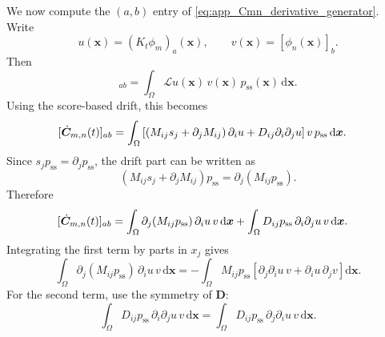 \documentclass[11pt,twoside,fleqn]{article}
\renewcommand{\d}{\mathrm{d}}
\begin{document}
We now compute the $(a,b)$ entry of \eqref{eq:app_Cmn_derivative_generator}. Write
\[
    u(\bm{x})=(K_t\phi_m)_a(\bm{x}),
    \qquad
    v(\bm{x})=[\phi_n(\bm{x})]_b .
\]
Then
\begin{equation}
    [\dot{\bm{C}}_{m,n}(t)]_{ab}
    =
    \int_\Omega
        \mathcal{L}u(\bm{x})\,
        v(\bm{x})\,
        p_{\mathrm{ss}}(\bm{x})\,
        \d\bm{x}.
    \label{eq:app_C_entry_uv}
\end{equation}
Using the score-based drift, this becomes
\begin{equation}
\begin{aligned}
    \relax[\dot{\bm{C}}_{m,n}(t)]_{ab}
    &=
    \int_\Omega
    \left[
        \left(
            M_{ij}s_j+\partial_jM_{ij}
        \right)\partial_i u
        +
        D_{ij}\partial_i\partial_j u
    \right]
    v\,p_{\mathrm{ss}}\,\d\bm{x}.
\end{aligned}
\label{eq:app_generator_expanded_uv}
\end{equation}
Since $s_jp_{\mathrm{ss}}=\partial_jp_{\mathrm{ss}}$, the drift part can be written as
\begin{equation}
    \left(
        M_{ij}s_j+\partial_jM_{ij}
    \right)p_{\mathrm{ss}}
    =
    \partial_j(M_{ij}p_{\mathrm{ss}}).
    \label{eq:app_drift_divergence_identity}
\end{equation}
Therefore
\begin{equation}
\begin{aligned}
    \relax[\dot{\bm{C}}_{m,n}(t)]_{ab}
    &=
    \int_\Omega
        \partial_j(M_{ij}p_{\mathrm{ss}})
        \,\partial_i u\,v\,\d\bm{x}
    +
    \int_\Omega
        D_{ij}p_{\mathrm{ss}}
        \,\partial_i\partial_j u\,v\,\d\bm{x}.
\end{aligned}
\label{eq:app_two_terms_before_parts}
\end{equation}
Integrating the first term by parts in $x_j$ gives
\begin{equation}
    \int_\Omega
        \partial_j(M_{ij}p_{\mathrm{ss}})
        \,\partial_i u\,v\,\d\bm{x}
    =
    -
    \int_\Omega
        M_{ij}p_{\mathrm{ss}}
        \left[
            \partial_j\partial_i u\,v
            +
            \partial_i u\,\partial_j v
        \right]\d\bm{x}.
    \label{eq:app_first_term_parts}
\end{equation}
For the second term, use the symmetry of $\bm{D}$:
\begin{equation}
    \int_\Omega
        D_{ij}p_{\mathrm{ss}}
        \,\partial_i\partial_j u\,v\,\d\bm{x}
    =
    \int_\Omega
        D_{ij}p_{\mathrm{ss}}
        \,\partial_j\partial_i u\,v\,\d\bm{x}.
    \label{eq:app_second_term_symmetry}
\end{equation}
\end{document}
